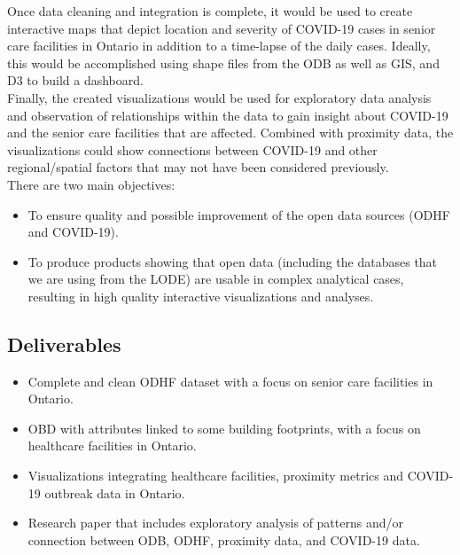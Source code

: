 \documentclass{article}
\begin{document}
Once data cleaning and integration is complete, it would be used to create interactive maps that depict location and severity of COVID-19 cases in senior care facilities in Ontario in addition to a time-lapse of the daily cases. Ideally, this would be accomplished using shape files from the ODB as well as GIS, and D3 to build a dashboard. \\

Finally, the created visualizations would be used for exploratory data analysis and observation of relationships within the data to gain insight about COVID-19 and the senior care facilities that are affected. Combined with proximity data, the visualizations could show connections between COVID-19 and other regional/spatial factors that may not have been considered previously. \\

There are two main objectives:

\begin{center}
\begin{itemize}
\item To ensure quality and possible improvement of the open data sources (ODHF and COVID-19).

\item To produce products showing that open data (including the databases that we are using from the LODE) are usable in complex analytical cases, resulting in high quality interactive visualizations and analyses.


\end{itemize}
\end{center}


\subsection{Deliverables}

\begin{center}
\begin{itemize}
\item Complete and clean ODHF dataset with a focus on senior care facilities in Ontario.

\item OBD with attributes linked to some building footprints, with a focus on healthcare facilities in Ontario.

\item Visualizations integrating healthcare facilities, proximity metrics and COVID-19 outbreak data in Ontario. 

\item Research paper that includes exploratory analysis of patterns and/or connection between ODB, ODHF, proximity data, and COVID-19 data.


\end{itemize}
\end{center}
\end{document}
